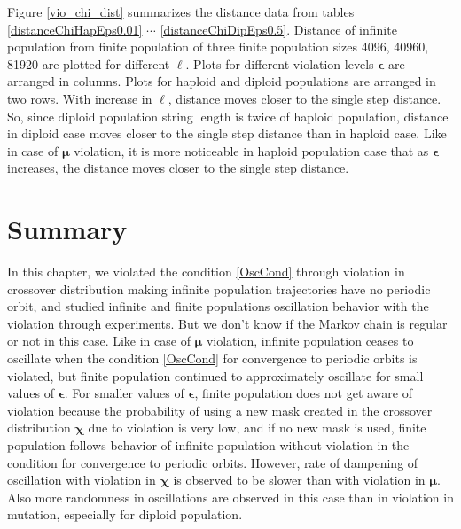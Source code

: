Figure \ref{vio_chi_dist} summarizes the distance data from tables \ref{distanceChiHapEps0.01} $\cdots$ 
\ref{distanceChiDipEps0.5}. Distance of infinite population from finite population of 
three finite population sizes {4096, 40960, 81920} are plotted for different $\ell$. 
Plots for different violation levels $\bm{\epsilon}$ are arranged in columns. 
Plots for haploid and diploid populations are arranged in two rows. With increase in $\ell$, 
distance moves closer to the single step distance. So, since diploid population 
string length is twice of haploid population, 
distance in diploid case moves closer to the single step distance than in haploid case. 
Like in case of $\bm{\mu}$ violation, it is more noticeable in haploid population case that as $\bm{\epsilon}$ increases, 
the distance moves closer to the single step distance.

\section{Summary}
In this chapter, we violated the condition \ref{OscCond} through violation in crossover distribution 
making infinite population trajectories have no periodic orbit, and 
studied infinite and finite populations oscillation behavior with the violation through experiments. 
But we don't know if the Markov chain is regular or not in this case. 
Like in case of $\bm{\mu}$ violation, infinite population ceases to oscillate when the condition \ref{OscCond} for convergence to 
periodic orbits is violated, but finite population continued to approximately oscillate for small values of $\bm{\epsilon}$. 
For smaller values of $\bm{\epsilon}$, finite population does not get aware of violation because the probability of using 
a new mask created in the crossover distribution $\bm{\chi}$ due to violation is very low, and 
if no new mask is used, finite population follows behavior of infinite population without violation in the condition for convergence to 
periodic orbits. However, rate of dampening of oscillation with violation 
in $\bm{\chi}$ is observed to be slower than with violation in ${\bm{\mu}}$. Also more randomness in oscillations are observed 
in this case than in violation in mutation, especially for diploid population.




